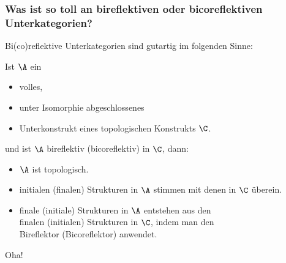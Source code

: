 \documentclass[serif,9pt]{beamer}
\begin{document}
\begin{frame}
  \frametitle{Was ist so toll an bireflektiven oder bicoreflektiven Unterkategorien?} 

\pause
  Bi(co)reflektive Unterkategorien sind gutartig im folgenden Sinne:
\pause

\begin{thm*}
  Ist $\A$ ein 
\begin{itemize}
\item volles,
\item unter Isomorphie abgeschlossenes
\item Unterkonstrukt eines topologischen Konstrukts $\C$.
\end{itemize}

\vspace{1em}
\pause
  und ist $\A$ bireflektiv (bicoreflektiv) in $\C$, dann:

\begin{itemize}
  \item<+-> $\A$ ist topologisch.
\item<+-> initialen (finalen) Strukturen in $\A$ stimmen mit denen in $\C$ überein.
\item<+-> finale (initiale) Strukturen in $\A$ entstehen aus den \\
finalen (initialen) Strukturen in $\C$, indem man den \\Bireflektor (Bicoreflektor) anwendet.
\end{itemize}
\end{thm*}

\pause
\vspace{1em}
\huge{Oha!}

\end{frame}
\end{document}
